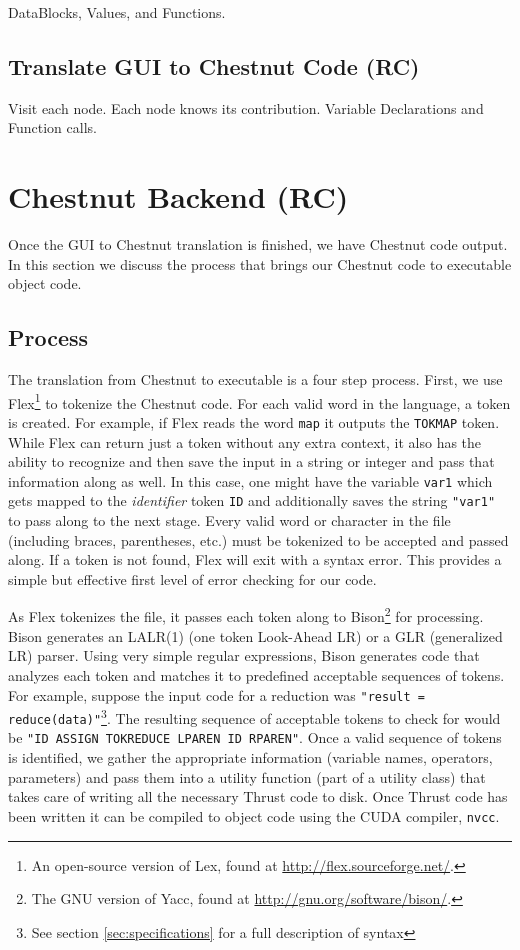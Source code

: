 \documentclass{article}
\renewcommand{\|}{\origbar} %
\newcommand{\code}[1]{\texttt{#1}}
\begin{document}
DataBlocks, Values, and Functions.

\subsection{Translate GUI to Chestnut Code (RC)}

Visit each node. Each node knows its contribution. Variable Declarations and Function calls.

\section{Chestnut Backend (RC)}

Once the GUI to Chestnut translation is finished, we have Chestnut code output. In this section we discuss the process that brings our Chestnut code to executable object code.

\subsection{Process}

The translation from Chestnut to executable is a four step process. First, we use Flex\footnote{An open-source version of Lex, found at \url{http://flex.sourceforge.net/}.} to tokenize the Chestnut code. For each valid word in the language, a token is created. For example, if Flex reads the word \code{map} it outputs the \code{TOKMAP} token. While Flex can return just a token without any extra context, it also has the ability to recognize and then save the input in a string or integer and pass that information along as well. In this case, one might have the variable \code{var1} which gets mapped to the {\em identifier} token \code{ID} and additionally saves the string \code{"var1"} to pass along to the next stage. Every valid word or character in the file (including braces, parentheses, etc.) must be tokenized to be accepted and passed along. If a token is not found, Flex will exit with a syntax error. This provides a simple but effective first level of error checking for our code.

As Flex tokenizes the file, it passes each token along to Bison\footnote{The GNU version of Yacc, found at \url{http://gnu.org/software/bison/}.} for processing. Bison generates an LALR(1) (one token Look-Ahead LR) or a GLR (generalized LR) parser. Using very simple regular expressions, Bison generates code that analyzes each token and matches it to predefined acceptable sequences of tokens. For example, suppose the input code for a reduction was \code{"result = reduce(data)"}\footnote{See section \ref{sec:specifications} for a full description of syntax}. The resulting sequence of acceptable tokens to check for would be \code{"ID ASSIGN TOKREDUCE LPAREN ID RPAREN"}. Once a valid sequence of tokens is identified, we gather the appropriate information (variable names, operators, parameters) and pass them into a utility function (part of a utility class) that takes care of writing all the necessary Thrust code to disk. Once Thrust code has been written it can be compiled to object code using the CUDA compiler, \code{nvcc}.
\end{document}
